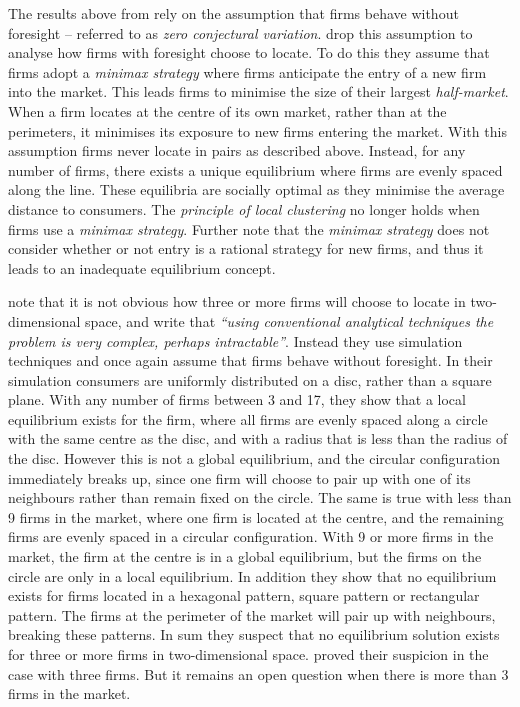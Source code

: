 \documentclass[preprint, 12pt]{elsarticle}
\begin{document}
The results above from \citet{Eaton_Lipsey_1975} rely on the assumption that firms behave without foresight -- referred to as \emph{zero conjectural variation}. \citet{Eaton_Lipsey_1975} drop this assumption to analyse how firms with foresight choose to locate. To do this they assume that firms adopt a \emph{minimax strategy} where firms anticipate the entry of a new firm into the market. This leads firms to minimise the size of their largest \emph{half-market}. When a firm locates at the centre of its own market, rather than at the perimeters, it minimises its exposure to new firms entering the market. With this assumption firms never locate in pairs as described above. Instead, for any number of firms, there exists a unique equilibrium where firms are evenly spaced along the line. These equilibria are socially optimal as they minimise the average distance to consumers. The \emph{principle of local clustering} no longer holds when firms use a \emph{minimax strategy}. Further note that the \emph{minimax strategy} does not consider whether or not entry is a rational strategy for new firms, and thus it leads to an inadequate equilibrium concept.

\citet[p.~40]{Eaton_Lipsey_1975} note that it is not obvious how three or more firms will choose to locate in two-dimensional space, and write that \emph{``using conventional analytical techniques the problem is very complex, perhaps intractable''}. Instead they use simulation techniques and once again assume that firms behave without foresight. In their simulation consumers are uniformly distributed on a disc, rather than a square plane. With any number of firms between 3 and 17, they show that a local equilibrium exists for the firm, where all firms are evenly spaced along a circle with the same centre as the disc, and with a radius that is less than the radius of the disc. However this is not a global equilibrium, and the circular configuration immediately breaks up, since one firm will choose to pair up with one of its neighbours rather than remain fixed on the circle. The same is true with less than 9 firms in the market, where one firm is located at the centre, and the remaining firms are evenly spaced in a circular configuration. With 9 or more firms in the market, the firm at the centre is in a global equilibrium, but the firms on the circle are only in a local equilibrium. In addition they show that no equilibrium exists for firms located in a hexagonal pattern, square pattern or rectangular pattern. The firms at the perimeter of the market will pair up with neighbours, breaking these patterns. In sum they suspect that no equilibrium solution exists for three or more firms in two-dimensional space. \citet{Shaked_1975} proved their suspicion in the case with three firms. But it remains an open question when there is more than 3 firms in the market.
\end{document}
